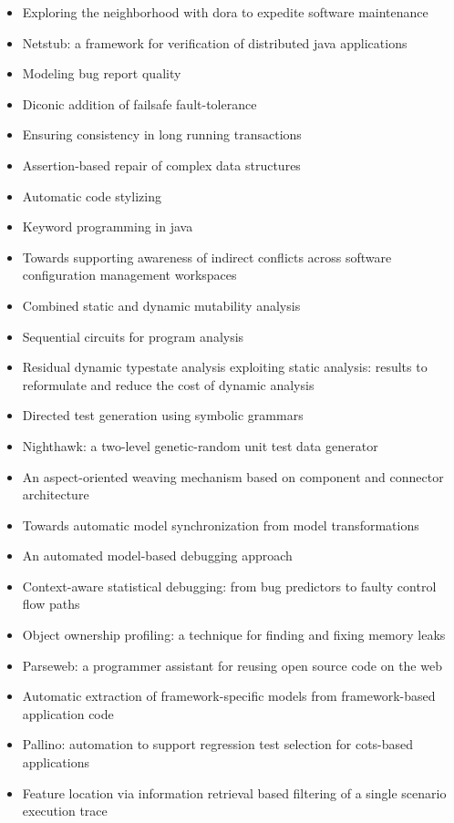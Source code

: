 {\small
\begin{itemize}[itemsep=-1ex]
  \item Exploring the neighborhood with dora to expedite software maintenance
  \item Netstub: a framework for verification of distributed java applications
  \item Modeling bug report quality
  \item Diconic addition of failsafe fault-tolerance
  \item Ensuring consistency in long running transactions
  \item Assertion-based repair of complex data structures
  \item Automatic code stylizing
  \item Keyword programming in java
  \item Towards supporting awareness of indirect conflicts across software configuration management workspaces
  \item Combined static and dynamic mutability analysis
  \item Sequential circuits for program analysis
  \item Residual dynamic typestate analysis exploiting static analysis: results to reformulate and reduce the cost of dynamic analysis
  \item Directed test generation using symbolic grammars
  \item Nighthawk: a two-level genetic-random unit test data generator
  \item An aspect-oriented weaving mechanism based on component and connector architecture
  \item Towards automatic model synchronization from model transformations
  \item An automated model-based debugging approach
  \item Context-aware statistical debugging: from bug predictors to faulty control flow paths
  \item Object ownership profiling: a technique for finding and fixing memory leaks
  \item Parseweb: a programmer assistant for reusing open source code on the web
  \item Automatic extraction of framework-specific models from framework-based application code
  \item Pallino: automation to support regression test selection for cots-based applications
  \item Feature location via information retrieval based filtering of a single scenario execution trace

\end{itemize}}
